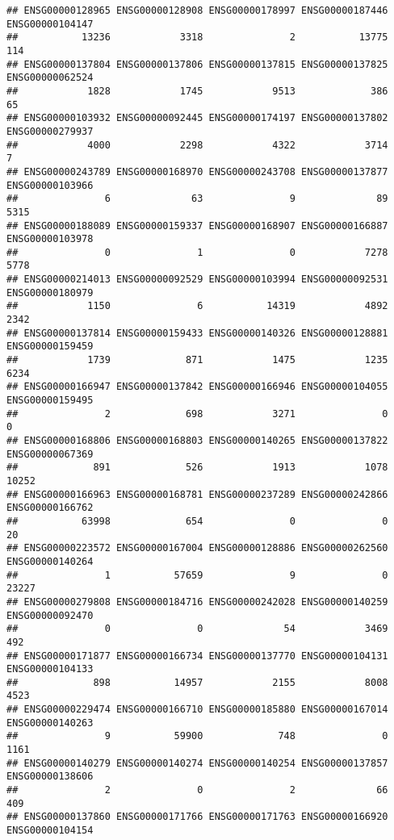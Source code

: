 \documentclass[
]{article}
\begin{document}
\begin{verbatim}
## ENSG00000128965 ENSG00000128908 ENSG00000178997 ENSG00000187446 ENSG00000104147 
##           13236            3318               2           13775             114 
## ENSG00000137804 ENSG00000137806 ENSG00000137815 ENSG00000137825 ENSG00000062524 
##            1828            1745            9513             386              65 
## ENSG00000103932 ENSG00000092445 ENSG00000174197 ENSG00000137802 ENSG00000279937 
##            4000            2298            4322            3714               7 
## ENSG00000243789 ENSG00000168970 ENSG00000243708 ENSG00000137877 ENSG00000103966 
##               6              63               9              89            5315 
## ENSG00000188089 ENSG00000159337 ENSG00000168907 ENSG00000166887 ENSG00000103978 
##               0               1               0            7278            5778 
## ENSG00000214013 ENSG00000092529 ENSG00000103994 ENSG00000092531 ENSG00000180979 
##            1150               6           14319            4892            2342 
## ENSG00000137814 ENSG00000159433 ENSG00000140326 ENSG00000128881 ENSG00000159459 
##            1739             871            1475            1235            6234 
## ENSG00000166947 ENSG00000137842 ENSG00000166946 ENSG00000104055 ENSG00000159495 
##               2             698            3271               0               0 
## ENSG00000168806 ENSG00000168803 ENSG00000140265 ENSG00000137822 ENSG00000067369 
##             891             526            1913            1078           10252 
## ENSG00000166963 ENSG00000168781 ENSG00000237289 ENSG00000242866 ENSG00000166762 
##           63998             654               0               0              20 
## ENSG00000223572 ENSG00000167004 ENSG00000128886 ENSG00000262560 ENSG00000140264 
##               1           57659               9               0           23227 
## ENSG00000279808 ENSG00000184716 ENSG00000242028 ENSG00000140259 ENSG00000092470 
##               0               0              54            3469             492 
## ENSG00000171877 ENSG00000166734 ENSG00000137770 ENSG00000104131 ENSG00000104133 
##             898           14957            2155            8008            4523 
## ENSG00000229474 ENSG00000166710 ENSG00000185880 ENSG00000167014 ENSG00000140263 
##               9           59900             748               0            1161 
## ENSG00000140279 ENSG00000140274 ENSG00000140254 ENSG00000137857 ENSG00000138606 
##               2               0               2              66             409 
## ENSG00000137860 ENSG00000171766 ENSG00000171763 ENSG00000166920 ENSG00000104154 

\end{verbatim}
\end{document}
